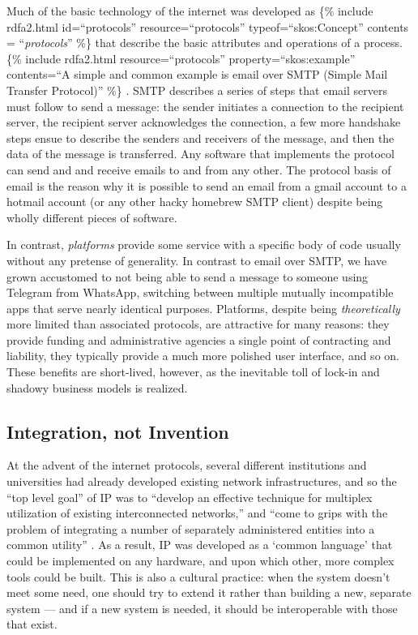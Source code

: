 \documentclass[10pt]{tufte-book}
\begin{document}
Much of the basic technology of the internet was developed as \{\%
include rdfa2.html id=``protocols'' resource=``protocols''
typeof=``skos:Concept'' contents = ``\emph{protocols}'' \%\} that
describe the basic attributes and operations of a process. \{\% include
rdfa2.html resource=``protocols'' property=``skos:example'' contents=``A
simple and common example is email over SMTP (Simple Mail Transfer
Protocol)'' \%\} \citep{Rfc5321SimpleMail} . SMTP describes a
series of steps that email servers must follow to send a message: the
sender initiates a connection to the recipient server, the recipient
server acknowledges the connection, a few more handshake steps ensue to
describe the senders and receivers of the message, and then the data of
the message is transferred. Any software that implements the protocol
can send and and receive emails to and from any other. The protocol
basis of email is the reason why it is possible to send an email from a
gmail account to a hotmail account (or any other hacky homebrew SMTP
client) despite being wholly different pieces of software.

In contrast, \emph{platforms} provide some service with a specific body
of code usually without any pretense of generality. In contrast to email
over SMTP, we have grown accustomed to not being able to send a message
to someone using Telegram from WhatsApp, switching between multiple
mutually incompatible apps that serve nearly identical purposes.
Platforms, despite being \emph{theoretically} more limited than
associated protocols, are attractive for many reasons: they provide
funding and administrative agencies a single point of contracting and
liability, they typically provide a much more polished user interface,
and so on. These benefits are short-lived, however, as the inevitable
toll of lock-in and shadowy business models is realized.


\subsection{Integration, not
Invention}

At the advent of the internet protocols, several different institutions
and universities had already developed existing network infrastructures,
and so the ``top level goal'' of IP was to ``develop an effective
technique for multiplex utilization of existing interconnected
networks,'' and ``come to grips with the problem of integrating a number
of separately administered entities into a common utility'' \citep{clarkDesignPhilosophyDARPA1988} . As a result, IP was developed as a
`common language' that could be implemented on any hardware, and upon
which other, more complex tools could be built. This is also a cultural
practice: when the system doesn't meet some need, one should try to
extend it rather than building a new, separate system --- and if a new
system is needed, it should be interoperable with those that exist.
\end{document}
